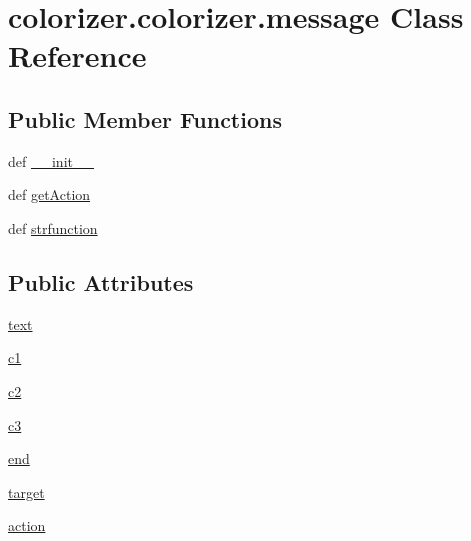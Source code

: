 \hypertarget{classcolorizer_1_1colorizer_1_1message}{\section{colorizer.\-colorizer.\-message Class Reference}
\label{classcolorizer_1_1colorizer_1_1message}
}
\subsection*{Public Member Functions}
\begin{DoxyCompactItemize}
\item 
def \hyperlink{classcolorizer_1_1colorizer_1_1message_afdf895a96af5fa8077039e1b03812fc5}{\-\_\-\-\_\-init\-\_\-\-\_\-}
\item 
def \hyperlink{classcolorizer_1_1colorizer_1_1message_a0363d3f532afe3e0e58ec14d2937bf99}{get\-Action}
\item 
def \hyperlink{classcolorizer_1_1colorizer_1_1message_a77551d77ff68d4059f48838556bcfcb8}{strfunction}
\end{DoxyCompactItemize}
\subsection*{Public Attributes}
\begin{DoxyCompactItemize}
\item 
\hyperlink{classcolorizer_1_1colorizer_1_1message_a49889a0d5e3bfe05ddfc0e84e2df9488}{text}
\item 
\hyperlink{classcolorizer_1_1colorizer_1_1message_a34c8a7ba613df5c5f76f98ca893e4b97}{c1}
\item 
\hyperlink{classcolorizer_1_1colorizer_1_1message_a83ac27449009768a9b53a94472296fcf}{c2}
\item 
\hyperlink{classcolorizer_1_1colorizer_1_1message_a9518ddf7524b43a529b3d1d122f452d5}{c3}
\item 
\hyperlink{classcolorizer_1_1colorizer_1_1message_a32f0dc7cbdec63989bdc497f0e170529}{end}
\item 
\hyperlink{classcolorizer_1_1colorizer_1_1message_a65138371d307f600a3b682fda567ef80}{target}
\item 
\hyperlink{classcolorizer_1_1colorizer_1_1message_abbd2e1e74467306f0162131c275b8403}{action}
\end{DoxyCompactItemize}


